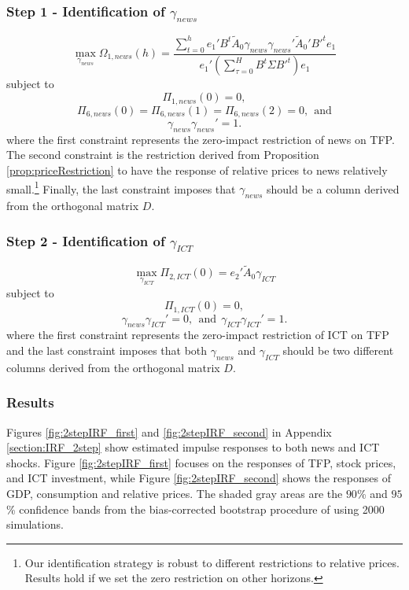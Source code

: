 \documentclass[12pt]{article}
\begin{document}
\subsubsection*{Step 1 - Identification of $\gamma_{news}$}
$$
\max_{\gamma_{news}} \Omega_{1,news}(h) = \frac{ \sum_{t=0}^h e_1' B^t \tilde{A}_0 \gamma_{news} \gamma_{news}' \tilde{A}_0' B'^t e_1 } {e_1' ( \sum_{\tau = 0}^H B^t \Sigma B'^t )e_1}
$$
subject to
$$
\Pi_{1,news}(0) = 0,
$$
$$
\Pi_{6,news}(0) = \Pi_{6,news}(1) = \Pi_{6,news}(2) = 0, \ \ \text{and}
$$
$$
\gamma_{news} \gamma_{news}' = 1.
$$
where the first constraint represents the zero-impact restriction of news on TFP. The second constraint is the restriction derived from Proposition \ref{prop:priceRestriction} to have the response of relative prices to news relatively small.\footnote{Our identification strategy is robust to different restrictions to relative prices. Results hold if we set the zero restriction on other horizons.} Finally, the last constraint imposes that $\gamma_{news}$ should be a column derived from the orthogonal matrix $D$. 


\subsubsection*{Step 2 - Identification of $\gamma_{ICT}$}
$$
\max_{\gamma_{ICT}} \Pi_{2,ICT}(0) =  e_2' \tilde{A}_0 \gamma_{ICT} 
$$
subject to
$$
\Pi_{1,ICT}(0) = 0,
$$
$$
\gamma_{news} \gamma_{ICT}' = 0, \ \ \text{and} \ \ \gamma_{ICT} \gamma_{ICT}' = 1.
$$
where the first constraint represents the zero-impact restriction of ICT on TFP and the last constraint imposes that both $\gamma_{news}$ and $\gamma_{ICT}$ should be two different columns derived from the orthogonal matrix $D$.

\subsubsection*{Results}

Figures \ref{fig:2stepIRF_first} and \ref{fig:2stepIRF_second} in Appendix \ref{section:IRF_2step} show estimated impulse responses to both news and ICT shocks. Figure \ref{fig:2stepIRF_first} focuses on the responses of TFP, stock prices, and ICT investment, while Figure \ref{fig:2stepIRF_second} shows the responses of GDP, consumption and relative prices. The shaded gray areas are the $90$\% and $95$\% confidence bands from the bias-corrected bootstrap procedure of \cite{kilian1998small} using 2000 simulations. 
\end{document}
